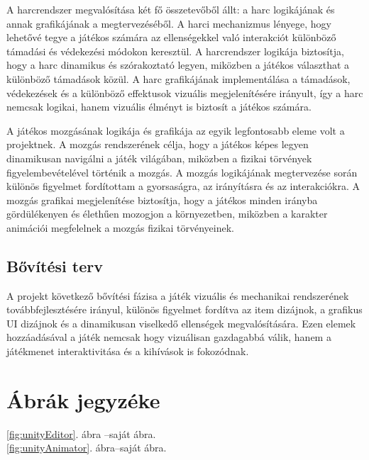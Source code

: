 \documentclass[
]{thesis-ekf}
\theoremstyle{definition}
\theoremstyle{remark}
\begin{document}
A harcrendszer megvalósítása két fő összetevőből állt: a harc logikájának és annak grafikájának a megtervezéséből. A harci mechanizmus lényege, hogy lehetővé tegye a játékos számára az ellenségekkel való interakciót különböző támadási és védekezési módokon keresztül. A harcrendszer logikája biztosítja, hogy a harc dinamikus és szórakoztató legyen, miközben a játékos választhat a különböző támadások közül. A harc grafikájának implementálása a támadások, védekezések és a különböző effektusok vizuális megjelenítésére irányult, így a harc nemcsak logikai, hanem vizuális élményt is biztosít a játékos számára.

A játékos mozgásának logikája és grafikája az egyik legfontosabb eleme volt a projektnek. A mozgás rendszerének célja, hogy a játékos képes legyen dinamikusan navigálni a játék világában, miközben a fizikai törvények figyelembevételével történik a mozgás. A mozgás logikájának megtervezése során különös figyelmet fordítottam a gyorsaságra, az irányításra és az interakciókra. A mozgás grafikai megjelenítése biztosítja, hogy a játékos minden irányba gördülékenyen és élethűen mozogjon a környezetben, miközben a karakter animációi megfelelnek a mozgás fizikai törvényeinek.

\section{Bővítési terv}
A projekt következő bővítési fázisa a játék vizuális és mechanikai rendszerének továbbfejlesztésére irányul, különös figyelmet fordítva az item dizájnok, a grafikus UI dizájnok és a dinamikusan viselkedő ellenségek megvalósítására. Ezen elemek hozzáadásával a játék nemcsak hogy vizuálisan gazdagabbá válik, hanem a játékmenet interaktivitása és a kihívások is fokozódnak.
\chapter*{Ábrák jegyzéke}
\begin{center}
	\ref{fig:unityEditor}. ábra --saját ábra.\\
	\ref{fig:unityAnimator}. ábra--saját ábra.
\end{center}
\end{document}

